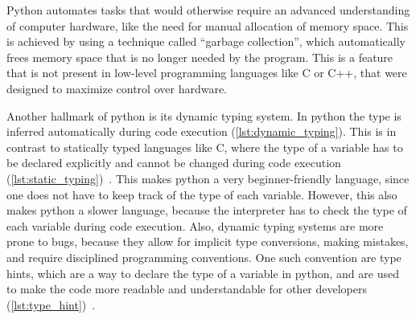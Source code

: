Python automates tasks that would otherwise require an advanced
understanding of computer hardware, like the need for manual allocation
of memory space. This is achieved by using a technique called ``garbage
collection'', which automatically frees memory space that is no longer
needed by the program. This is a feature that is not present in
low-level programming languages like C or C++, that were designed to
maximize control over hardware.

Another hallmark of python is its dynamic typing system. In python the
type  is inferred automatically during code execution
(\autoref{lst:dynamic_typing}). This is in contrast to statically typed
languages like C, where the type of a variable has to be declared
explicitly and cannot be changed during code execution
(\autoref{lst:static_typing})~\cite{PythonLanguageReference}. This makes
python a very beginner-friendly language, since one does not have to
keep track of the type of each variable. However, this also makes python
a slower language, because the interpreter has to check the type of each
variable during code execution. Also, dynamic typing systems are more
prone to bugs, because they allow for implicit type conversions, making
mistakes, and require disciplined programming conventions. One such
convention are type hints, which are a way to declare the type of a
variable in python, and are used to make the code more readable and
understandable for other developers
(\autoref{lst:type_hint})~\cite{vanrossumPEP484Type2014}.


